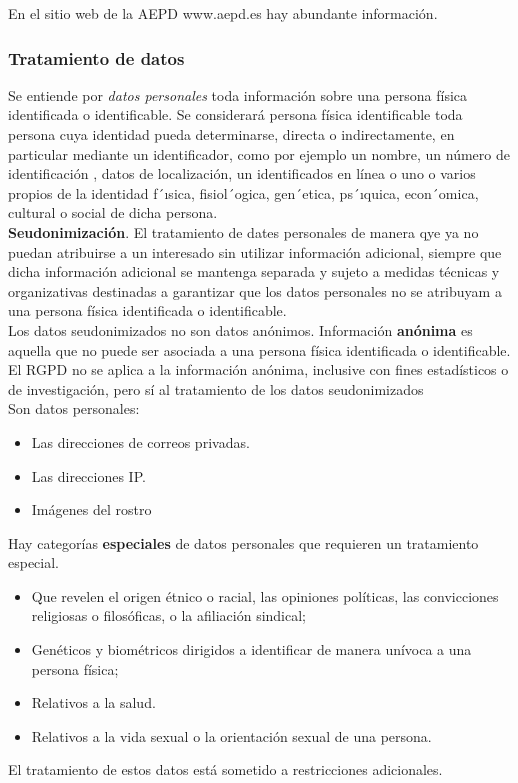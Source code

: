 \documentclass[spanish, 12pt, a4paper, twoside]{article}
\begin{document}
En el sitio web de la AEPD www.aepd.es hay abundante información.

\subsubsection{Tratamiento de datos}

Se entiende por \textit{datos personales} toda información sobre una persona física identificada o identificable.
Se considerará persona física identificable toda persona cuya identidad pueda determinarse, directa o 
indirectamente, en particular mediante un identificador, como por ejemplo un nombre, un número de identificación
, datos de localización, un identificados en línea o uno o varios propios de la identidad f´ısica, fisiol´ogica, gen´etica, ps´ıquica, econ´omica, cultural
o social de dicha persona.\\

\textbf{Seudonimización}. El tratamiento de dates personales de manera qye ya no puedan atribuirse a un interesado
sin utilizar información adicional, siempre que dicha información adicional se mantenga separada y sujeto 
a medidas técnicas y organizativas destinadas a garantizar que los datos personales no se atribuyam a una persona física
identificada o identificable.\\

Los datos seudonimizados no son datos anónimos. Información \textbf{anónima} es aquella que no puede ser asociada a una persona
 física identificada o identificable. El RGPD no se aplica a la información anónima, inclusive con fines
 estadísticos o de investigación, pero sí al tratamiento de los datos seudonimizados\\

Son datos personales:
\begin{itemize}
    \item Las direcciones de correos privadas.
    \item Las direcciones IP.
    \item Imágenes del rostro
\end{itemize}

Hay categorías \textbf{especiales} de datos personales que requieren un tratamiento especial.\\

\begin{itemize}
    \item Que revelen el origen étnico o racial, las opiniones políticas, las convicciones
    religiosas o filosóficas, o la afiliación sindical;
    \item Genéticos y biométricos dirigidos a identificar de manera unívoca a una
persona física;
    \item Relativos a la salud.
    \item Relativos a la vida sexual o la orientación sexual de una persona.
\end{itemize}
El tratamiento de estos datos está sometido a restricciones adicionales.\\
\end{document}
